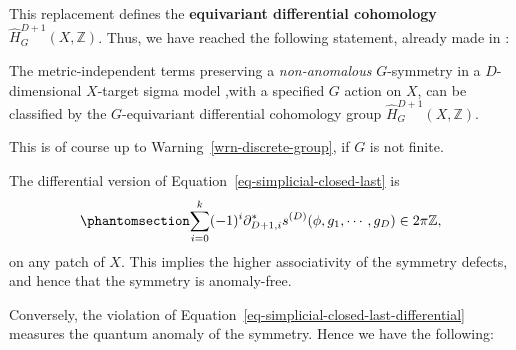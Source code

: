 \documentclass[11pt,toc=bibliography]{scrbook}
\numberwithin{equation}{section}
\begin{document}
This replacement defines the \textbf{equivariant differential
cohomology} \(\hat{H}^{D+1}_G(X,\mathbb{Z})\). Thus, we have reached the
following statement, already made in \autocite{Davighi:2020vcm}:

\begin{tcolorbox}[enhanced jigsaw, opacityback=0, opacitybacktitle=0.6, leftrule=.75mm, arc=.35mm, coltitle=black, breakable, colframe=quarto-callout-important-color-frame, titlerule=0mm, colback=white, bottomrule=.15mm, left=2mm, colbacktitle=quarto-callout-important-color!10!white, toptitle=1mm, bottomtitle=1mm, title=\textcolor{quarto-callout-important-color}{\faExclamation}\hspace{0.5em}{Important \ref*{imp-equivariant-classification}: Sigma Model Terms and Equivariant Differential Cohomology}, rightrule=.15mm, toprule=.15mm]


The metric-independent terms preserving a \emph{non-anomalous}
\(G\)-symmetry in a \(D\)-dimensional \(X\)-target sigma model ,with a
specified \(G\) action on \(X\), can be classified by the
\(G\)-equivariant differential cohomology group
\(\hat{H}_G^{D+1}(X,\mathbb{Z})\).

This is of course up to Warning~\ref{wrn-discrete-group}, if \(G\) is
not finite.

\end{tcolorbox}

The differential version of Equation~\ref{eq-simplicial-closed-last} is
\begin{equation}\phantomsection\label{eq-simplicial-closed-last-differential}{
\sum_{i=0}^{k} (-1)^{i} \partial_{D+1,i}^* s^{(D)}(\phi,g_1,\cdots,g_D) \in 2\pi\mathbb{Z},
}\end{equation} on any patch of \(X\). This implies the higher
associativity of the symmetry defects, and hence that the symmetry is
anomaly-free.

Conversely, the violation of
Equation~\ref{eq-simplicial-closed-last-differential} measures the
quantum anomaly of the symmetry. Hence we have the following:
\end{document}

